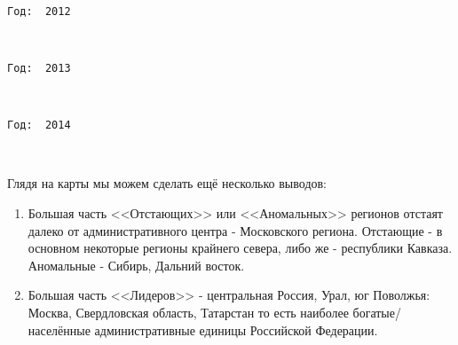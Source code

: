 \documentclass[11pt]{article}
\begin{document}
    \begin{center}
    \end{center}
    { \hspace*{\fill} \\}
    
    \begin{Verbatim}[commandchars=\\\{\}]
Год:  2012

    \end{Verbatim}

    \begin{center}
    \end{center}
    { \hspace*{\fill} \\}
    
    \begin{Verbatim}[commandchars=\\\{\}]
Год:  2013

    \end{Verbatim}

    \begin{center}
    \end{center}
    { \hspace*{\fill} \\}
    
    \begin{Verbatim}[commandchars=\\\{\}]
Год:  2014

    \end{Verbatim}

    \begin{center}
    \end{center}
    { \hspace*{\fill} \\}
    
    Глядя на карты мы можем сделать ещё несколько выводов:

\begin{enumerate}
\item Большая часть <<Отстающих>> или <<Аномальных>> регионов отстаят далеко от административного центра - Московского региона. Отстающие - в основном некоторые регионы крайнего севера, либо же - республики Кавказа. Аномальные - Сибирь, Дальний восток.
\item Большая часть <<Лидеров>> - центральная Россия, Урал, юг Поволжья: Москва, Свердловская область, Татарстан то есть наиболее богатые/населённые  административные единицы Российской Федерации.
\end{enumerate}


    
    
    
    
\end{document}
